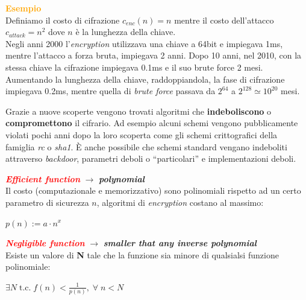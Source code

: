 \begin{boxA}
    \textcolor{orange}{\textbf{Esempio}} \\
    Definiamo il costo di cifrazione $c_{enc}(n) = n$ mentre il costo dell'attacco $c_{attack} = n^2$ dove $n$ è la lunghezza della chiave. \\
    Negli anni 2000 l'\textit{encryption} utilizzava una chiave a 64bit e impiegava 1ms, mentre l'attacco a forza bruta, impiegava 2 anni. Dopo 10 anni, nel 2010, con la stessa chiave la cifrazione impiegava 0.1ms e il suo brute force 2 mesi. \\ \newline
    Aumentando la lunghezza della chiave, raddoppiandola, la fase di cifrazione impiegava 0.2ms, mentre quella di \textit{brute force} passava da $2^{64}$ a $2^{128} \simeq 10^{20}$ mesi.
\end{boxA}

\begin{flushleft}
    Grazie a nuove scoperte vengono trovati algoritmi che \textbf{indeboliscono} o \textbf{compromettono} il cifrario. Ad esempio alcuni schemi vengono pubblicamente violati pochi anni dopo la loro scoperta come gli schemi crittografici della famiglia \textit{rc} o \textit{sha1}. È anche possibile che schemi standard vengano indeboliti attraverso \textit{backdoor}, parametri deboli o ``particolari'' e implementazioni deboli.
\end{flushleft}

\begin{flushleft}
    \textcolor{red}{\textbf{\textit{Efficient function}}} $\rightarrow$ \textbf{\textit{polynomial}} \\
    Il costo (computazionale e memorizzativo) sono polinomiali rispetto ad un certo parametro di sicurezza $n$, algoritmi di \textit{encryption} costano al massimo: 
    
    {\centering
        $p(n) := a \cdot n^x$
    \par}

    \textcolor{red}{\textbf{\textit{Negligible function}}} $\rightarrow$ \textbf{\textit{smaller that any inverse polynomial}} \\
    Esiste un valore di \textbf{N} tale che la funzione sia minore di qualsialsi funzione polinomiale:

    {\centering
        $\exists N \; \text{t.c.} \; f(n) < \frac{1}{p(n)}, \; \forall \; n < N$
    \par}
\end{flushleft}

